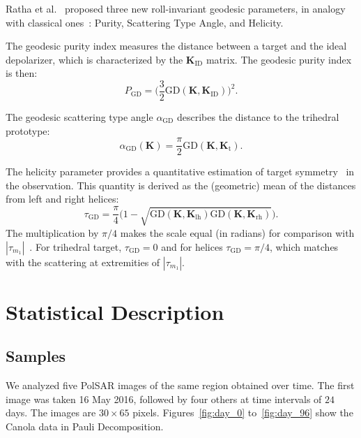 \documentclass[journal]{IEEEtran}
\begin{document}
	Ratha et al.~\cite{APolSARScatteringPowerFactorizationFrameworkandNovelRollInvariantParametersBasedUnsupervisedClassificationSchemeUsingaGeodesicDistanceinpress} proposed three new roll-invariant geodesic parameters, in analogy with classical ones~\cite{gil85,CloudePottier:97,Touzi:TGARS:2007}: Purity, Scattering Type Angle, and Helicity.%
	
	The geodesic purity index measures the distance between a target and the ideal depolarizer, which is characterized by the $\bm{K}_{\text{ID}}$ matrix.
	The geodesic purity index is then:
	\begin{equation}
	P_{\text{GD}} = \Big(\frac{3}{2}\text{GD}(\bm{K}, \bm{K}_{\text{ID}})\Big)^2.
	\end{equation}
	
	The geodesic scattering type angle $\alpha_{\text{GD}}$ describes 
	the distance to the trihedral prototype:
	\begin{equation}
	\alpha_{\text{GD}}(\bm{K}) = \frac{\pi}{2}  \text{GD}(\bm{K},\bm{K}_{\text{t}}).
	\end{equation}
	
	The helicity parameter provides a quantitative estimation of target symmetry~\cite{Touzi:TGARS:2007} in the observation. 
	This quantity is derived as the (geometric) mean of the distances from left and right helices:
	\begin{equation}
	\tau_{\text{GD}} = \frac\pi4 \big(1 - \sqrt{\text{GD}(\bm{K},\bm{K}_{\text{lh}})\text{GD}(\bm{K},\bm{K}_{\text{rh}})}\big).
	\end{equation}
	The multiplication by $\pi/4$ makes the scale equal (in radians) for comparison with $|\tau_{m_1}|$~\cite{Touzi:TGARS:2007}. 
	For trihedral target, $\tau_{\text{GD}} = 0$ and for helices $\tau_{\text{GD}} = \pi/4$, which matches with the scattering at extremities of $|\tau_{m_1}|$. 
	
	\section{Statistical Description}
	
	\subsection{Samples}
	
	We analyzed five PolSAR images of the same region obtained over time. The first image was taken 16 May 2016, followed by four others at time intervals of $24$ days. The images are $30 \times 65$ pixels.
	Figures~\ref{fig:day_0} to~\ref{fig:day_96} show the Canola data in Pauli Decomposition. 
	
\end{document}
